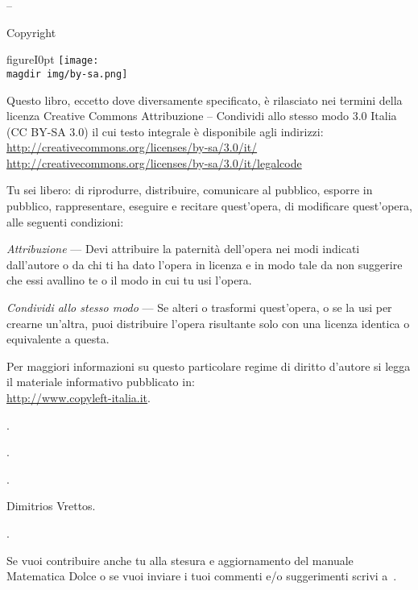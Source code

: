 
\thispagestyle{empty}
{\setlength{\parindent}{0em}\small{
\begin{center}
{\large{\serie – \titolo}}

Copyright {\textcopyright} {\anno} \editore
\end{center}

\begin{wrapfloat}{figure}{I}{0pt}
\texttt{[image: \\magdir img/by-sa.png]}
\end{wrapfloat}

Questo libro, eccetto dove diversamente specificato, è rilasciato nei 
termini della licenza Creative Commons Attribuzione – Condividi allo stesso 
modo 3.0 Italia (CC BY-SA 3.0) il cui testo integrale è disponibile agli 
indirizzi:\\
\url{http://creativecommons.org/licenses/by-sa/3.0/it/}\\
\url{http://creativecommons.org/licenses/by-sa/3.0/it/legalcode}

Tu sei libero:
di riprodurre, distribuire, comunicare al pubblico, esporre in pubblico, 
rappresentare, eseguire e recitare quest'opera, di modificare quest'opera, 
alle seguenti condizioni:

\emph{Attribuzione} --- Devi attribuire la paternità dell'opera nei modi 
indicati dall'autore o da chi ti ha dato l'opera in licenza e in modo tale 
da non suggerire che essi avallino te o il modo in cui tu usi l'opera.

\emph{Condividi allo stesso modo} --- Se alteri o trasformi quest'opera, 
o se la usi per crearne un'altra, puoi distribuire l'opera risultante solo 
con una licenza identica o equivalente a questa.

Per maggiori informazioni su questo particolare regime di diritto d'autore 
si legga il materiale informativo pubblicato in:\\
\url{http://www.copyleft-italia.it}.

 \coord .

 \autori.

 \colab.

 {Dimitrios Vrettos}.

 {\texcol}.

 Se vuoi contribuire anche tu alla stesura e aggiornamento 
del manuale Matematica Dolce o se  vuoi inviare i tuoi commenti e/o 
suggerimenti scrivi 
a~.

}}
